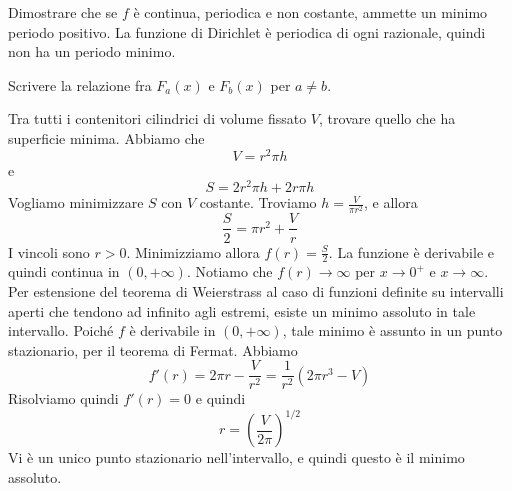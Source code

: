 \documentclass[a4paper]{article}
\begin{document}
\begin{snippetexercise}{}
    Dimostrare che se \(f\) è continua, periodica e non costante, ammette un minimo periodo positivo.
    La funzione di Dirichlet è periodica di ogni razionale, quindi non ha un periodo minimo.
\end{snippetexercise}

\begin{snippetexercise}{}
    Scrivere la relazione fra \(F_a(x)\) e \(F_b(x)\)
    per \(a \neq b\).
\end{snippetexercise}

\begin{snippetexercise}{Tra tutti i contenitori cilindrici di volume fissato \(V\),
trovare quello che ha superficie minima.}
    Abbiamo che \[
        V = r^2 \pi h
    \]
    e
    \[
        S = 2 r^2 \pi h + 2r\pi h
    \]
    Vogliamo minimizzare \(S\) con \(V\) costante.
    Troviamo \(h = \frac{V}{\pi r^2}\), e allora
    \[
        \frac{S}{2} = \pi r^2 + \frac{V}{r}
    \]
    I vincoli sono \(r>0\). Minimizziamo allora \(f(r) = \frac{S}{2}\).
    La funzione è derivabile e quindi continua in \((0, +\infty)\).
    Notiamo che \(f(r) \to \infty\) per \(x \to 0^+\) e \(x\to\infty\).
    Per estensione del teorema di Weierstrass al caso di funzioni definite
    su intervalli aperti che tendono ad infinito agli estremi, esiste un minimo assoluto in tale intervallo.
    Poiché \(f\) è derivabile in \((0, +\infty)\), tale minimo è assunto in un punto stazionario,
    per il teorema di Fermat. Abbiamo
    \[
        f'(r) = 2\pi r - \frac{V}{r^2} = \frac{1}{r^2}(2\pi r^3 - V)
    \]
    Risolviamo quindi \(f'(r) = 0\) e quindi
    \[
        r = {\left(\frac{V}{2\pi}\right)}^{1/2}
    \]
    Vi è un unico punto stazionario nell'intervallo, e quindi questo è il minimo assoluto.
\end{snippetexercise}
\end{document}
